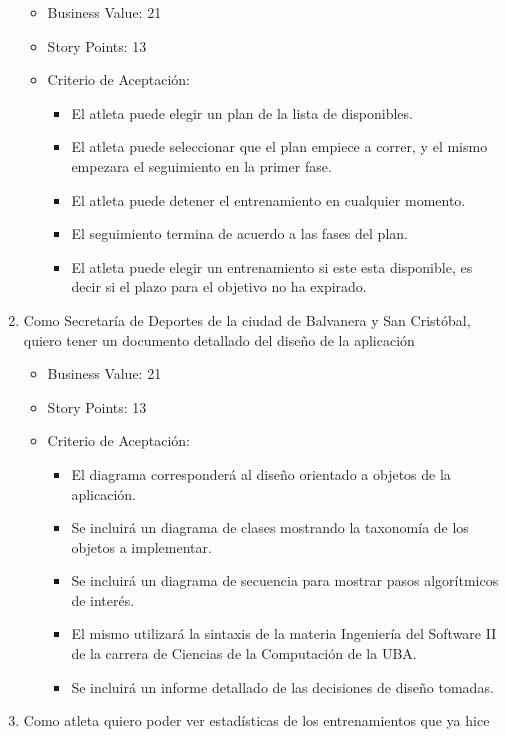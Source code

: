 \begin{enumerate}
  \begin{itemize}
  \itemsep1pt\parskip0pt
  \item
    Business Value: 21
  \item
    Story Points: 13
  \item
    Criterio de Aceptación:

    \begin{itemize}
    \itemsep1pt\parskip0pt
    \item
      El atleta puede elegir un plan de la lista de disponibles.
    \item
      El atleta puede seleccionar que el plan empiece a correr, y el
      mismo empezara el seguimiento en la primer fase.
    \item
      El atleta puede detener el entrenamiento en cualquier momento.
    \item
      El seguimiento termina de acuerdo a las fases del plan.
    \item
      El atleta puede elegir un entrenamiento si este esta disponible,
      es decir si el plazo para el objetivo no ha expirado.
    \end{itemize}
  \end{itemize}
\item
  Como Secretaría de Deportes de la ciudad de Balvanera y San Cristóbal,
  quiero tener un documento detallado del diseño de la aplicación

  \begin{itemize}
  \itemsep1pt\parskip0pt
  \item
    Business Value: 21
  \item
    Story Points: 13
  \item
    Criterio de Aceptación:

    \begin{itemize}
    \itemsep1pt\parskip0pt
    \item
      El diagrama corresponderá al diseño orientado a objetos de la
      aplicación.
    \item
      Se incluirá un diagrama de clases mostrando la taxonomía de los
      objetos a implementar.
    \item
      Se incluirá un diagrama de secuencia para mostrar pasos
      algorítmicos de interés.
    \item
      El mismo utilizará la sintaxis de la materia Ingeniería del
      Software II de la carrera de Ciencias de la Computación de la UBA.
    \item
      Se incluirá un informe detallado de las decisiones de diseño
      tomadas.
    \end{itemize}
  \end{itemize}
\item
  Como atleta quiero poder ver estadísticas de los entrenamientos que ya
  hice


\end{enumerate}

